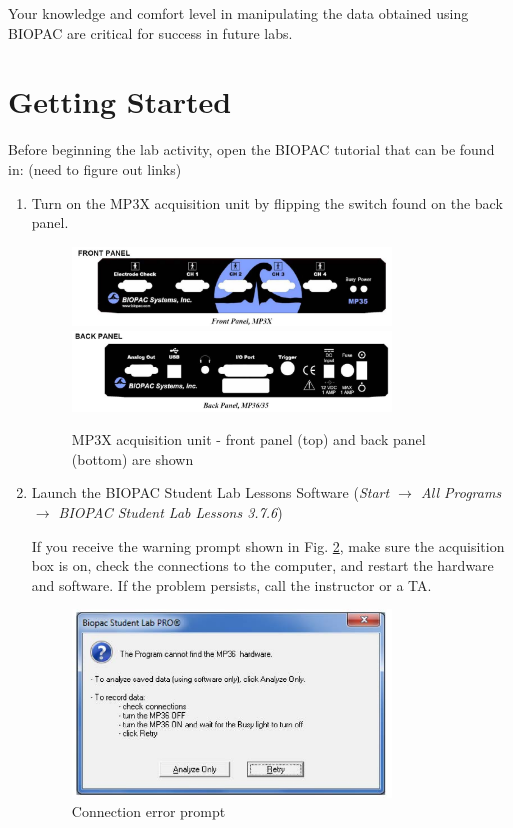 \documentclass{article}
\begin{document}
\begin{info}
	Your knowledge and comfort level in manipulating the data obtained using BIOPAC are critical for success in future labs.
\end{info}

\section*{Getting Started}
Before beginning the lab activity, open the BIOPAC tutorial that can be found in: (need to figure out links)

\begin{enumerate}
	\item Turn on the MP3X acquisition unit by flipping the switch found on the back panel.
		\begin{figure}[h]
		\includegraphics[width=0.8\textwidth]{../images/BIOPAC_2a.jpg}
		\includegraphics[width=0.8\textwidth]{../images/BIOPAC_2b.jpg}
		\centering
		\caption{MP3X acquisition unit - front panel (top) and back panel (bottom) are shown}
		\label{panels}
		\end{figure}
		
	\item Launch the BIOPAC Student Lab Lessons Software (\textit{Start $\rightarrow$ All Programs $\rightarrow$ BIOPAC Student Lab Lessons 3.7.6})
	
	\begin{warn}
		If you receive the warning prompt shown in Fig. \ref{conn_error}, make sure the acquisition box is on, check the connections to the computer, and restart the hardware and software. If the problem persists, call the instructor or a TA.
	\end{warn}
	
		\begin{figure}[h]
		\includegraphics[width=0.8\textwidth]{../images/BIOPAC_3.jpg}
		\centering
		\caption{Connection error prompt}
		\label{conn_error}
		\end{figure}
		

\end{enumerate}
\end{document}
